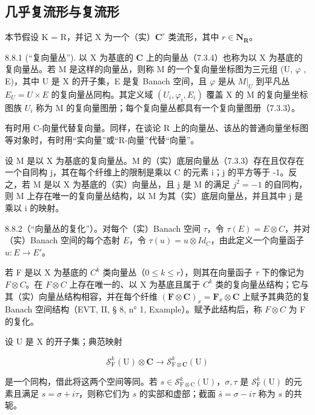 \subsection{几乎复流形与复流形}

本节假设 K = R，并记 X 为一个（实）\(\mathbf{C}^{r}\) 类流形，其中 \(r \in \mathbf{N}_{\mathbf{R}}\)。

8.8.1 (“复向量丛”). 以 X 为基底的 \(\mathbf{C}\) 上的向量丛（7.3.4）也称为以 X 为基底的复向量丛。若 M 是这样的向量丛，则称 M 的一个复向量坐标图为三元组 (U, \(\varphi\) , E)，其中 U 是 X 的开子集，E 是复 Banach 空间，且 \(\varphi\) 是从 \(M|_U\) 到平凡丛 \(E_U = U \times E\) 的复向量丛同构。其定义域 \((U_i,\varphi_i,E_i)\) 覆盖 X 的 M 的复向量坐标图族 \(U_i\) 称为 M 的复向量图册；每个复向量丛都具有一个复向量图册（7.3.3）。

有时用 C-向量代替复向量。同样，在谈论 R 上的向量丛、该丛的普通向量坐标图等对象时，有时用“实向量”或“R-向量”代替“向量”。

设 M 是以 X 为基底的复向量丛。M 的（实）底层向量丛（7.3.3）存在且仅存在一个自同构 j，其在每个纤维上的限制是乘以 C 的元素 i；j 的平方等于 -1。反之，若 M 是以 X 为基底的（实）向量丛，且 j 是 M 的满足 \(j^{2} = -1\) 的自同构，则 M 上存在唯一的复向量丛结构，以 M 为其（实）底层向量丛，并且其中 j 是乘以 i 的映射。

8.8.2（“向量丛的复化”）。对每个（实）Banach 空间 \(\tau\)，令 \(\tau(E) = E \otimes C\)，并对（实）Banach 空间的每个态射 \(E\)，令 \(\tau(u) = u \otimes Id_{C}\)，由此定义一个向量函子 \(u: E \to E'\)。

若 F 是以 X 为基底的 \(C^{k}\) 类向量丛（\(0 \leqslant k \leqslant r\)），则其在向量函子 \(\tau\) 下的像记为 \(F \otimes C\)。在 \(F \otimes C\) 上存在唯一的、以 X 为基底且属于 \(C^{k}\) 类的复向量丛结构；它与其（实）向量丛结构相容，并在每个纤维 \((\mathbf{F} \otimes \mathbf{C})_{x} = \mathbf{F}_{x} \otimes \mathbf{C}\) 上赋予其典范的复 Banach 空间结构（EVT, II, § 8, n° 1, Example）。赋予此结构后，称 \(F \otimes C\) 为 F 的复化。

设 U 是 X 的开子集；典范映射

\[
\mathcal {S} _ {\mathrm{F}} ^ {k} (\mathrm{U}) \otimes \mathbf {C} \rightarrow \mathcal {S} _ {\mathrm{F} \otimes \mathbf {C}} ^ {k} (\mathrm{U})
\]

是一个同构，借此将这两个空间等同。若 \(s \in \mathcal{S}_{\mathrm{F} \otimes \mathrm{C}}^{k}(\mathrm{U})\)，\(\sigma, \tau\) 是 \(\mathcal{S}_{\mathrm{F}}^{k}(\mathrm{U})\) 的元素且满足 \(s = \sigma + i\tau\)，则称它们为 \(s\) 的实部和虚部；截面 \(\bar{s} = \sigma - i\tau\) 称为 \(s\) 的共轭。

